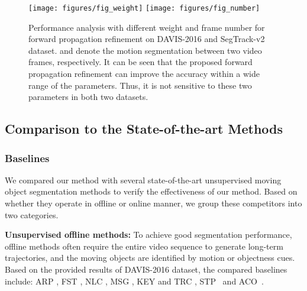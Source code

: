 \documentclass[journal]{IEEEtran}
\begin{document}
\begin{figure}[!t]
	\texttt{[image: figures/fig\_weight]}
	\quad
	\texttt{[image: figures/fig\_number]}
	\caption{Performance analysis with different weight  and frame number  for forward propagation refinement on DAVIS-2016 and SegTrack-v2 dataset.  and  denote the motion segmentation between two video frames, respectively. It can be seen that the proposed forward propagation refinement can improve the accuracy within a wide range of the parameters. Thus, it is not sensitive to these two parameters in both two datasets.}
	\label{fig_parameters}
\end{figure}
 
\subsection{Comparison to the State-of-the-art Methods}
\label{sec:exp-comp}

\subsubsection{Baselines}
We compared our method with several state-of-the-art unsupervised moving object segmentation methods to verify the effectiveness of our method. Based on whether they operate in offline or online manner, we group these competitors into two categories.

{\bf Unsupervised offline methods:} 
To achieve good segmentation performance, offline methods often require the entire video sequence to generate long-term trajectories,
and the moving objects are identified by motion or objectness cues. 
Based on the provided results of DAVIS-2016 dataset,
the compared baselines include: ARP \cite{CVPR2017_Koh}, FST \cite{ICCV2013_Papazoglou}, NLC \cite{BMVC2014_Faktor}, MSG \cite{ICCV2011_Ochs}, KEY \cite{ICCV2011_Lee} and TRC \cite{CVPR2012_Fragkiadaki}, STP~\cite{CVPR2013_Zhang} and ACO~\cite{CVPR2016_Jang}.
\end{document}
